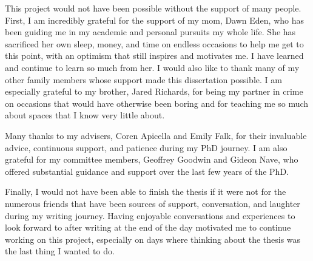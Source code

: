 \documentclass[a4paper, nobind]{templates/ociamthesis}
\begin{document}

\begin{romanpages}




\renewcommand{\numberstyleacks}{plain}
\renewcommand{\numberstyleabstract}{plain}


\begin{acknowledgements}
 	This project would not have been possible without the support of many people. First, I am incredibly grateful for the support of my mom, Dawn Eden, who has been guiding me in my academic and personal pursuits my whole life. She has sacrificed her own sleep, money, and time on endless occasions to help me get to this point, with an optimism that still inspires and motivates me. I have learned and continue to learn so much from her. I would also like to thank many of my other family members whose support made this dissertation possible. I am especially grateful to my brother, Jared Richards, for being my partner in crime on occasions that would have otherwise been boring and for teaching me so much about spaces that I know very little about.

  Many thanks to my advisers, Coren Apicella and Emily Falk, for their invaluable advice, continuous support, and patience during my PhD journey. I am also grateful for my committee members, Geoffrey Goodwin and Gideon Nave, who offered substantial guidance and support over the last few years of the PhD.

  Finally, I would not have been able to finish the thesis if it were not for the numerous friends that have been sources of support, conversation, and laughter during my writing journey. Having enjoyable conversations and experiences to look forward to after writing at the end of the day motivated me to continue working on this project, especially on days where thinking about the thesis was the last thing I wanted to do.
\end{acknowledgements}




\end{romanpages}
\end{document}
